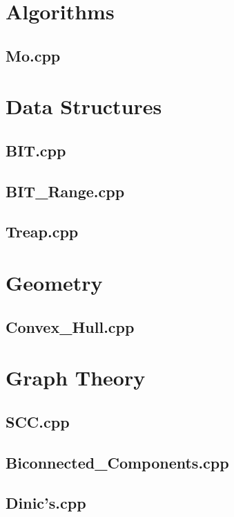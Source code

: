 \section{Algorithms}
\subsection{Mo.cpp}

\section{Data Structures}
\subsection{BIT.cpp}

\subsection{BIT\_Range.cpp}

\subsection{Treap.cpp}

\section{Geometry}
\subsection{Convex\_Hull.cpp}

\section{Graph Theory}
\subsection{SCC.cpp}

\subsection{Biconnected\_Components.cpp}

\subsection{Dinic's.cpp}

